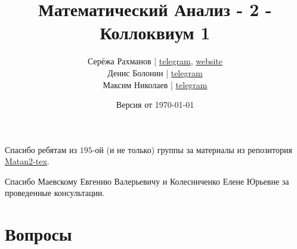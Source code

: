\documentclass[a4paper]{article}
\title{\Huge Математический Анализ - 2 - Коллоквиум 1}
\author{
    Серёжа Рахманов | \href{https://t.me/virg1n}{telegram}, \href{http://shoraii.github.io}{website}
    \\
    Денис Болонин | \href{https://t.me/ultrakekul}{telegram}
    \\
    Максим Николаев | \href{https://t.me/MaximND}{telegram}

}
\date{Версия от {\ddmmyyyydate\today} \currenttime}
\begin{document}
    \maketitle


    Спасибо ребятам из $195$-ой (и не только) группы за материалы из репозитория \href{https://github.com/DKozl50/Matan2-tex}{Matan2-tex}.

    Спасибо Маевскому Евгению Валерьевичу и Колесниченко Елене Юрьевне за проведенные консультации.
    
    \tableofcontents

    \newpage

    \section{Вопросы}
\end{document}

